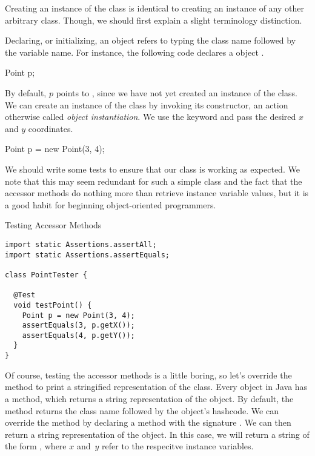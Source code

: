 Creating an instance of the  class is identical to creating an instance of any other arbitrary class. Though, we should first explain a slight terminology distinction.

Declaring, or initializing, an object refers to typing the class name followed by the variable name. For instance, the following code declares a  object .

\begin{verbnobox}[\small]
Point p;
\end{verbnobox}

By default, $p$ points to , since we have not yet created an instance of the  class. We can create an instance of the  class by invoking its constructor, an action otherwise called \emph{object instantiation}. We use the  keyword and pass the desired $x$ and $y$ coordinates. 

\begin{verbnobox}[\small]
Point p = new Point(3, 4);
\end{verbnobox}

We should write some tests to ensure that our  class is working as expected. We note that this may seem redundant for such a simple class and the fact that the accessor methods do nothing more than retrieve instance variable values, but it is a good habit for beginning object-oriented programmers.

\begin{cl}[]{Testing Accessor Methods}
\begin{lstlisting}[language=MyJava]
import static Assertions.assertAll;
import static Assertions.assertEquals;

class PointTester {
  
  @Test
  void testPoint() {
    Point p = new Point(3, 4);
    assertEquals(3, p.getX());
    assertEquals(4, p.getY());
  }
}
\end{lstlisting}
\end{cl}

Of course, testing the accessor methods is a little boring, so let's override the  method to print a stringified representation of the  class. Every object in Java has a  method, which returns a string representation of the object. By default, the  method returns the class name followed by the object's hashcode. We can override the  method by declaring a  method with the signature . We can then return a string representation of the object. In this case, we will return a string of the form , where $x$ and~$y$ refer to the respecitve instance variables.

